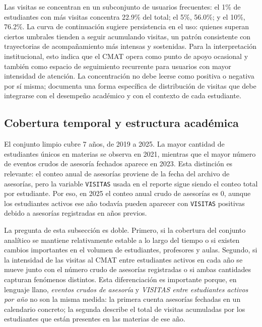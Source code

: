\documentclass[10pt,letterpaper]{article} %
\numberwithin{figure}{subsection}
\begin{document}
Las visitas se concentran en un subconjunto de usuarios frecuentes: el 1\% de estudiantes con más visitas concentra 22.9\% del total; el 5\%, 56.0\%; y el 10\%, 76.2\%. La curva de continuación sugiere persistencia en el uso: quienes superan ciertos umbrales tienden a seguir acumulando visitas, un patrón consistente con trayectorias de acompañamiento más intensas y sostenidas. Para la interpretación institucional, esto indica que el CMAT opera como punto de apoyo ocasional y también como espacio de seguimiento recurrente para usuarios con mayor intensidad de atención. La concentración no debe leerse como positiva o negativa por sí misma; documenta una forma específica de distribución de visitas que debe integrarse con el desempeño académico y con el contexto de cada estudiante.

\begin{table}[!htbp]
    \centering
    \caption{Indicadores de concentración y dispersión estructural de las visitas.}
    \label{tab:data_concentration}
    
\end{table}

\newpage
\subsection{Cobertura temporal y estructura académica}
El conjunto limpio cubre 7 años, de 2019 a 2025. La mayor cantidad de estudiantes únicos en materias se observa en 2021, mientras que el mayor número de eventos crudos de asesoría fechados aparece en 2023. Esta distinción es relevante: el conteo anual de asesorías proviene de la fecha del archivo de asesorías, pero la variable \texttt{VISITAS} usada en el reporte sigue siendo el conteo total por estudiante. Por eso, en 2025 el conteo anual crudo de asesorías es 0, aunque los estudiantes activos ese año todavía pueden aparecer con \texttt{VISITAS} positivas debido a asesorías registradas en años previos.

La pregunta de esta subsección es doble. Primero, si la cobertura del conjunto analítico se mantiene relativamente estable a lo largo del tiempo o si existen cambios importantes en el volumen de estudiantes, profesores y aulas. Segundo, si la intensidad de las visitas al CMAT entre estudiantes activos en cada año se mueve junto con el número crudo de asesorías registradas o si ambas cantidades capturan fenómenos distintos. Esta diferenciación es importante porque, en lenguaje llano, \emph{eventos crudos de asesoría} y \emph{VISITAS entre estudiantes activos por año} no son la misma medida: la primera cuenta asesorías fechadas en un calendario concreto; la segunda describe el total de visitas acumuladas por los estudiantes que están presentes en las materias de ese año.
\end{document}
